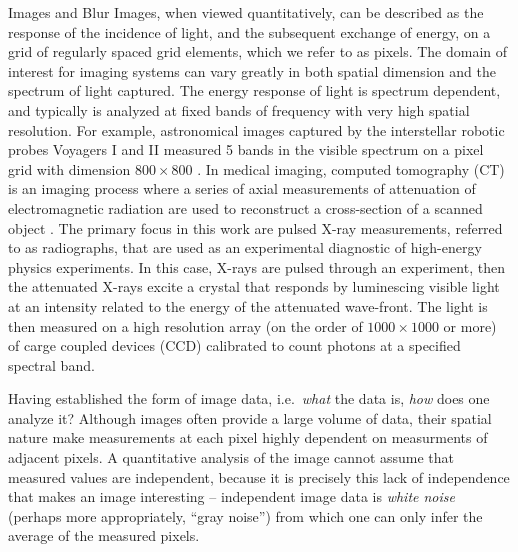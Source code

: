 \begin{chapter}{Images and Blur}
  Images, when viewed quantitatively, can be described as the response of the incidence of light, and the subsequent exchange of energy, on a grid of regularly spaced grid elements, which we refer to as pixels.
  The domain of interest for imaging systems can vary greatly in both spatial dimension and the spectrum of light captured. 
  The energy response of light is spectrum dependent, and typically is analyzed at fixed bands of frequency with very high spatial resolution.
  For example, astronomical images captured by the interstellar robotic probes Voyagers I and II measured 5 bands in the visible spectrum on a pixel grid with dimension $800 \times 800$ \citep{voyager}.
  In medical imaging, computed tomography (CT) is an imaging process where a series of axial measurements of attenuation of electromagnetic radiation are used to reconstruct a cross-section of a scanned object \citep{epstein2008}.
  The primary focus in this work are pulsed X-ray measurements, referred to as radiographs, that are used as an experimental diagnostic of high-energy physics experiments.  
  In this case, X-rays are pulsed through an experiment, then the attenuated X-rays excite a crystal that responds by luminescing visible light at an intensity related to the energy of the attenuated wave-front.  
  The light is then measured on a high resolution array (on the order of $1000\times1000$ or more) of carge coupled devices (CCD) calibrated to count photons at a specified spectral band.

  Having established the form of image data, i.e.~\emph{what} the data is, \emph{how} does one analyze it?
  Although images often provide a large volume of data, their spatial nature make measurements at each pixel highly dependent on measurments of adjacent pixels.
  A quantitative analysis of the image cannot assume that measured values are independent, because it is precisely this lack of independence that makes an image interesting -- independent image data is \emph{white noise} (perhaps more appropriately, ``gray noise'') from which one can only infer the average of the measured pixels.


\end{chapter}

